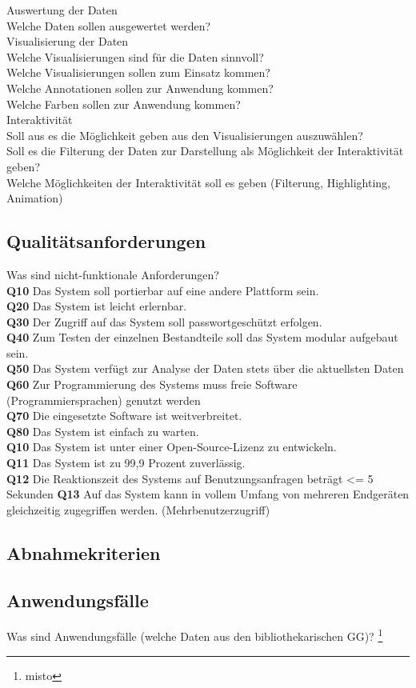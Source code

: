Auswertung der Daten\\
Welche Daten sollen ausgewertet werden?\\



Visualisierung der Daten\\
Welche Visualisierungen sind für die Daten sinnvoll?\\
Welche Visualisierungen sollen zum Einsatz kommen?\\
Welche Annotationen sollen zur Anwendung kommen?\\
Welche Farben sollen zur Anwendung kommen?\\



Interaktivität\\
Soll aus es die Möglichkeit geben aus den Visualisierungen auszuwählen?\\
Soll es die Filterung der Daten zur Darstellung als Möglichkeit der Interaktivität geben?\\
Welche Möglichkeiten der Interaktivität soll es geben (Filterung, Highlighting, Animation)\\
\subsection{Qualitätsanforderungen}
Was sind nicht-funktionale Anforderungen?\\
\textbf{Q10} Das System soll portierbar auf eine andere Plattform sein.\\
\textbf{Q20} Das System ist leicht erlernbar.\\
\textbf{Q30} Der Zugriff auf das System soll passwortgeschützt erfolgen.\\
\textbf{Q40} Zum Testen der einzelnen Bestandteile soll das System modular aufgebaut sein.\\
\textbf{Q50} Das System verfügt zur Analyse der Daten stets über die aktuellsten Daten\\
\textbf{Q60} Zur Programmierung des Systems muss freie Software (Programmiersprachen) genutzt werden\\
\textbf{Q70} Die eingesetzte Software ist weitverbreitet.\\
\textbf{Q80} Das System ist einfach zu warten.\\
\textbf{Q10} Das System ist unter einer Open-Source-Lizenz zu entwickeln.\\
\textbf{Q11} Das System ist zu 99,9 Prozent zuverlässig.\\
\textbf{Q12} Die Reaktionszeit des Systems auf Benutzungsanfragen beträgt <= 5 Sekunden
\textbf{Q13} Auf das System kann in vollem Umfang von mehreren Endgeräten gleichzeitig zugegriffen werden. (Mehrbenutzerzugriff)



\subsection{Abnahmekriterien}
\subsection{Anwendungsfälle}
Was sind Anwendungsfälle (welche Daten aus den bibliothekarischen GG)? 
\footnote{misto}